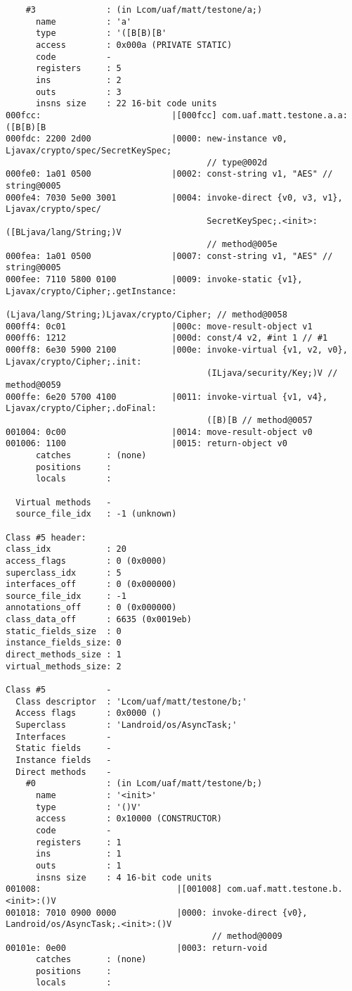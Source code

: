\begin{lstlisting}
    #3              : (in Lcom/uaf/matt/testone/a;)
      name          : 'a'
      type          : '([B[B)[B'
      access        : 0x000a (PRIVATE STATIC)
      code          -
      registers     : 5
      ins           : 2
      outs          : 3
      insns size    : 22 16-bit code units
000fcc:                          |[000fcc] com.uaf.matt.testone.a.a:([B[B)[B
000fdc: 2200 2d00                |0000: new-instance v0, Ljavax/crypto/spec/SecretKeySpec;
                                        // type@002d
000fe0: 1a01 0500                |0002: const-string v1, "AES" // string@0005
000fe4: 7030 5e00 3001           |0004: invoke-direct {v0, v3, v1}, Ljavax/crypto/spec/
                                        SecretKeySpec;.<init>:([BLjava/lang/String;)V
                                        // method@005e
000fea: 1a01 0500                |0007: const-string v1, "AES" // string@0005
000fee: 7110 5800 0100           |0009: invoke-static {v1}, Ljavax/crypto/Cipher;.getInstance:
                                        (Ljava/lang/String;)Ljavax/crypto/Cipher; // method@0058
000ff4: 0c01                     |000c: move-result-object v1
000ff6: 1212                     |000d: const/4 v2, #int 1 // #1
000ff8: 6e30 5900 2100           |000e: invoke-virtual {v1, v2, v0}, Ljavax/crypto/Cipher;.init:
                                        (ILjava/security/Key;)V // method@0059
000ffe: 6e20 5700 4100           |0011: invoke-virtual {v1, v4}, Ljavax/crypto/Cipher;.doFinal:
                                        ([B)[B // method@0057
001004: 0c00                     |0014: move-result-object v0
001006: 1100                     |0015: return-object v0
      catches       : (none)
      positions     :
      locals        :

  Virtual methods   -
  source_file_idx   : -1 (unknown)

Class #5 header:
class_idx           : 20
access_flags        : 0 (0x0000)
superclass_idx      : 5
interfaces_off      : 0 (0x000000)
source_file_idx     : -1
annotations_off     : 0 (0x000000)
class_data_off      : 6635 (0x0019eb)
static_fields_size  : 0
instance_fields_size: 0
direct_methods_size : 1
virtual_methods_size: 2

Class #5            -
  Class descriptor  : 'Lcom/uaf/matt/testone/b;'
  Access flags      : 0x0000 ()
  Superclass        : 'Landroid/os/AsyncTask;'
  Interfaces        -
  Static fields     -
  Instance fields   -
  Direct methods    -
    #0              : (in Lcom/uaf/matt/testone/b;)
      name          : '<init>'
      type          : '()V'
      access        : 0x10000 (CONSTRUCTOR)
      code          -
      registers     : 1
      ins           : 1
      outs          : 1
      insns size    : 4 16-bit code units
001008:                           |[001008] com.uaf.matt.testone.b.<init>:()V
001018: 7010 0900 0000            |0000: invoke-direct {v0}, Landroid/os/AsyncTask;.<init>:()V
                                         // method@0009
00101e: 0e00                      |0003: return-void
      catches       : (none)
      positions     :
      locals        :


\end{lstlisting}
